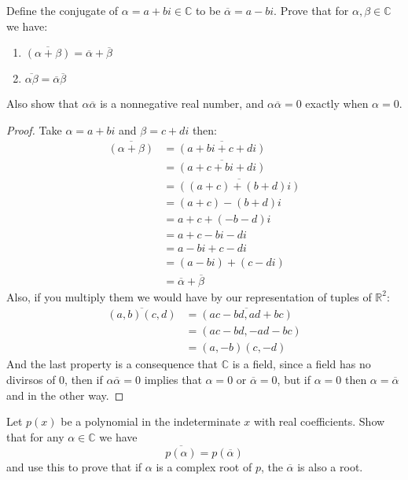 \documentclass{tufte-handout}
\begin{document}
\begin{problem}
	Define the conjugate of $\alpha = a+bi \in \mathbb{C}$ to be $\overline{\alpha} = a-bi$. Prove that for $\alpha, \beta \in \mathbb{C}$ we have:
	\begin{enumerate}
		\item $\overline{(\alpha+\beta)} = \overline{\alpha} + \overline{\beta}$
		\item $\overline{\alpha\beta} = \overline{\alpha} \overline{\beta}$
	\end{enumerate}
	Also show that $\alpha\overline{\alpha}$ is a nonnegative real number, and $\alpha\overline{\alpha} = 0$ exactly when $\alpha = 0$.
\end{problem}
\begin{proof}
	Take $\alpha = a+bi$ and $\beta = c+di$ then:
	\begin{align*}
		\overline{(\alpha + \beta)} &= \overline{(a+bi+c+di)}\\
		&= \overline{(a+c + bi+di)}\\
		&= \overline{((a+c) + (b+d)i)}\\
		&= (a+c)-(b+d)i\\
		&= a+c+(-b-d)i\\
		&= a+c-bi-di\\
		&= a-bi + c-di\\
		&= (a-bi) + (c-di)\\
		&= \overline{\alpha} + \overline{\beta}
	\end{align*}
	Also, if you multiply them we would have by our representation of tuples of $\mathbb{R}^2$:
	\begin{align*}
		\overline{(a, b)(c, d)} &= \overline{(ac-bd, ad+bc)}\\
		&= (ac-bd, -ad-bc)\\
		&= (a, -b)(c, -d)
	\end{align*}
	And the last property is a consequence that $\mathbb{C}$ is a field, since a field has no divirsos of $0$, then if $\alpha\overline{\alpha} = 0$ implies that $\alpha = 0$ or $\overline{\alpha} = 0$, but if $\alpha = 0$ then $\alpha = \overline{\alpha}$ and in the other way.
\end{proof}
\begin{problem}
	Let $p(x)$ be a polynomial in the indeterminate $x$ with real coefficients. Show that for any $\alpha \in \mathbb{C}$ we have $$\overline{p(\alpha)} = p(\overline{\alpha})$$ and use this to prove that if $\alpha$ is a complex root of $p$, the $\overline{\alpha}$ is also a root.
\end{problem}
\end{document}
